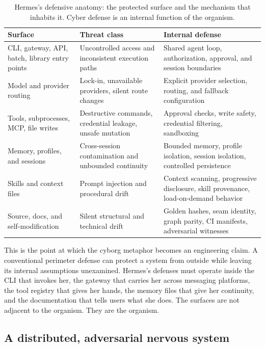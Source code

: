 \documentclass[11pt]{article}
\theoremstyle{definition}
\theoremstyle{plain}
\theoremstyle{remark}
\begin{document}
\begin{table}[H]
\centering
\caption{Hermes's defensive anatomy: the protected surface and the mechanism
that inhabits it. Cyber defense is an internal function of the organism.}
\label{tab:hermes-defense}
\begin{tabular}{@{}p{}p{}p{}@{}}
\toprule
Surface & Threat class & Internal defense \\
\midrule
CLI, gateway, API, batch, library entry points & Uncontrolled access and inconsistent execution paths & Shared agent loop, authorization, approval, and session boundaries \\
Model and provider routing & Lock-in, unavailable providers, silent route changes & Explicit provider selection, routing, and fallback configuration \\
Tools, subprocesses, MCP, file writes & Destructive commands, credential leakage, unsafe mutation & Approval checks, write safety, credential filtering, sandboxing \\
Memory, profiles, and sessions & Cross-session contamination and unbounded continuity & Bounded memory, profile isolation, session isolation, controlled persistence \\
Skills and context files & Prompt injection and procedural drift & Context scanning, progressive disclosure, skill provenance, load-on-demand behavior \\
Source, docs, and self-modification & Silent structural and technical drift & Golden hashes, seam identity, graph parity, CI manifests, adversarial witnesses \\
\bottomrule
\end{tabular}
\end{table}

This is the point at which the cyborg metaphor becomes an engineering claim.
A conventional perimeter defense can protect a system from outside while
leaving its internal assumptions unexamined. Hermes's defenses must operate
inside the CLI that invokes her, the gateway that carries her across messaging
platforms, the tool registry that gives her hands, the memory files that give
her continuity, and the documentation that tells users what she does. The
surfaces are not adjacent to the organism. They are the organism.

\subsection{A distributed, adversarial nervous system}
\end{document}
